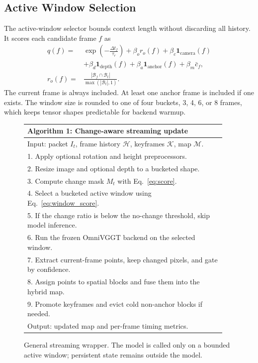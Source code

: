 \documentclass[conference]{IEEEtran}
\begin{document}
\subsection{Active Window Selection}
The active-window selector bounds context length without discarding all history. It scores each candidate frame $f$ as
\begin{equation}
\begin{aligned}
q(f)=&\exp\left(-\frac{\Delta t_f}{\tau_r}\right)
+\beta_o r_o(f)
+\beta_c \mathbf{1}_{\mathrm{camera}}(f)\\
&+\beta_d \mathbf{1}_{\mathrm{depth}}(f)
+\beta_a \mathbf{1}_{\mathrm{anchor}}(f)
+\beta_m \bar{c}_f,\\
r_o(f)=&\frac{|\mathcal{B}_f \cap \mathcal{B}_t|}
{\max(|\mathcal{B}_t|,1)} .
\end{aligned}
\label{eq:window_score}
\end{equation}
The current frame is always included. At least one anchor frame is included if one exists. The window size is rounded to one of four buckets, 3, 4, 6, or 8 frames, which keeps tensor shapes predictable for backend warmup.

\begin{figure}[t]
\centering
\footnotesize
\begin{tabular}{p{0.94\linewidth}}
\toprule
\textbf{Algorithm 1: Change-aware streaming update}\\
\midrule
Input: packet $I_t$, frame history $\mathcal{H}$, keyframes $\mathcal{K}$, map $\mathcal{M}$.\\
1. Apply optional rotation and height preprocessors.\\
2. Resize image and optional depth to a bucketed shape.\\
3. Compute change mask $M_t$ with Eq.~\eqref{eq:score}.\\
4. Select a bucketed active window using Eq.~\eqref{eq:window_score}.\\
5. If the change ratio is below the no-change threshold, skip model inference.\\
6. Run the frozen OmniVGGT backend on the selected window.\\
7. Extract current-frame points, keep changed pixels, and gate by confidence.\\
8. Assign points to spatial blocks and fuse them into the hybrid map.\\
9. Promote keyframes and evict cold non-anchor blocks if needed.\\
Output: updated map and per-frame timing metrics.\\
\bottomrule
\end{tabular}
\caption{General streaming wrapper. The model is called only on a bounded active window; persistent state remains outside the model.}
\label{fig:alg_stream}
\end{figure}
\end{document}
